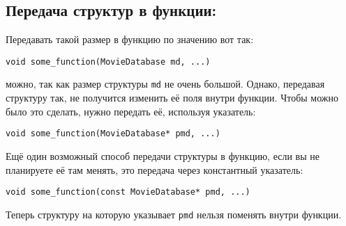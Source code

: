 \documentclass{article}
\begin{document}
\subsection*{Передача структур в функции:}
Передавать такой размер в функцию по значению вот так:
\begin{lstlisting}
void some_function(MovieDatabase md, ...)
\end{lstlisting} 
можно, так как размер структуры \texttt{md} не очень большой. Однако, передавая структуру так, не получится изменить её поля внутри функции. Чтобы можно было это сделать, нужно передать её, используя указатель:
\begin{lstlisting}
void some_function(MovieDatabase* pmd, ...)
\end{lstlisting}
Ещё один возможный способ передачи структуры в функцию, если вы не планируете её там менять, это передача через константный указатель:
\begin{lstlisting}
void some_function(const MovieDatabase* pmd, ...)
\end{lstlisting}
Теперь структуру на которую указывает \texttt{pmd} нельзя поменять внутри функции.
\end{document}
